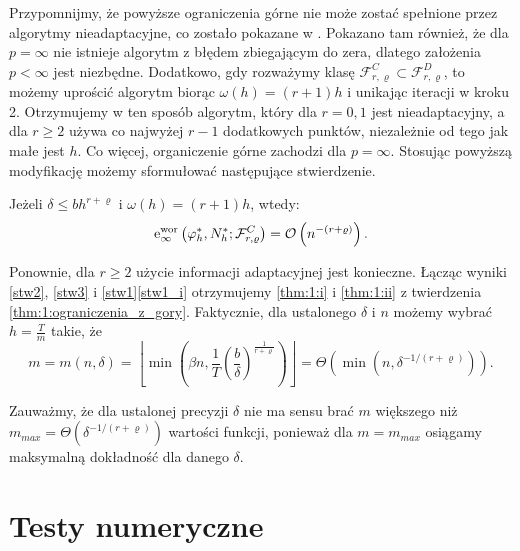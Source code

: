 \documentclass[oik, pdftex, robocza, man]{mgrwms}
\begin{document}
    Przypomnijmy, że powyższe ograniczenia górne nie może zostać spełnione przez algorytmy nieadaptacyjne, co zostało pokazane w \cite{PoA}. Pokazano tam również, że dla $p=\infty$ nie istnieje algorytm z błędem zbiegającym do zera, dlatego założenia $p < \infty$ jest niezbędne. Dodatkowo, gdy rozważymy klasę $\mathcal{F}_{r, \varrho}^{C} \subset \mathcal{F}_{r, \varrho}^{D}$, to możemy uprościć algorytm biorąc $\omega(h) = (r+1)h$ i unikając iteracji w kroku 2. Otrzymujemy w ten sposób algorytm, który dla $r=0,1$ jest nieadaptacyjny, a dla $r \geq 2$ używa co najwyżej $r-1$ dodatkowych punktów, niezależnie od tego jak małe jest $h$. Co więcej, organiczenie górne zachodzi dla $p = \infty$.
    Stosując powyższą modyfikację możemy sformułować następujące stwierdzenie.

    \begin{stw}
        \label{stw3}
        Jeżeli $\delta \leq bh^{r+\varrho}$ i $\omega(h) = (r+1)h$, wtedy:
        \begin{equation}
            \mathrm{e}_{\infty}^{\mathrm{\mathrm{wor}}}\left(\varphi_{h}^{*}, N_{h}^{*} ; \mathcal{F}_{r, \varrho}^{C}\right)=\mathcal{O}\left(n^{-(r+\varrho)}\right) .
        \end{equation}
    \end{stw}

    Ponownie, dla $r \geq 2$ użycie informacji adaptacyjnej jest konieczne. Łącząc wyniki \eqref{stw2}, \eqref{stw3} i \eqref{stw1}\eqref{stw1_i} otrzymujemy \ref{thm:1:i} i \ref{thm:1:ii} z twierdzenia \eqref{thm:1:ograniczenia_z_gory}.
    Faktycznie, dla ustalonego $\delta$ i $n$ możemy wybrać $h = \frac{T}{m}$ takie, że
    \begin{equation}
        m = m(n, \delta)=\left\lfloor\min \left(\beta n, \frac{1}{T}\left(\frac{b}{\delta}\right)^{\frac{1}{r+\varrho}}\right)\right\rfloor=\varTheta\left(\min \left(n, \delta^{-1 /(r+\varrho)}\right)\right).
    \end{equation}

    \begin{uw} \label{uw:2}
        Zauważmy, że dla ustalonej precyzji $\delta$ nie ma sensu brać $m$ większego niż $m_{max} = \varTheta(\delta^{-1 / (r+\varrho)})$ wartości funkcji, ponieważ dla $m = m_{max}$ osiągamy maksymalną dokładność dla danego $\delta$.
    \end{uw}

\mgrclosechapter


\chapter{Testy numeryczne}
\end{document}
